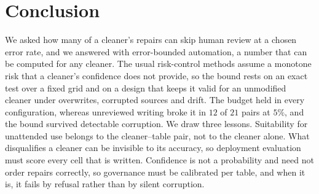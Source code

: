 \documentclass[sigconf, nonacm, balance=false]{acmart}
\theoremstyle{remark}
\begin{document}
\section{Conclusion}

We asked how many of a cleaner's repairs can skip human review at a chosen error rate,
and we answered with error-bounded automation, a number that can be computed for any
cleaner. The usual risk-control methods assume a monotone risk that a cleaner's
confidence does not provide, so the bound rests on an exact test over a fixed grid and
on a design that keeps it valid for an unmodified cleaner under overwrites, corrupted
sources and drift. The budget held in every configuration, whereas unreviewed writing broke it in
$12$ of $21$ pairs at $5\%$, and the bound survived detectable corruption. We draw three
lessons. Suitability for unattended use belongs to the cleaner--table pair, not to the
cleaner alone. What disqualifies a cleaner can be invisible to its accuracy, so
deployment evaluation must score every cell that is written. Confidence is not a
probability and need not order repairs correctly, so governance must be calibrated per
table, and when it is, it fails by refusal rather than by silent corruption.





\end{document}
